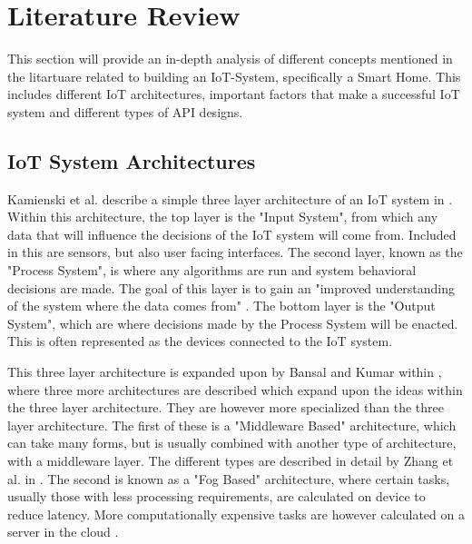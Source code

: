 \chapter{Literature Review} \label{cha:chapter2}
This section will provide an in-depth analysis of different concepts mentioned in the litartuare related to building an IoT-System, specifically a Smart Home. This includes different IoT architectures, important factors that make a successful IoT system and different types of API designs. 

\section{IoT System Architectures} \label{sec:chap2:architectures}
Kamienski et al. describe a simple three layer architecture of an IoT system in \cite{DesigningOpenIotSystem}. Within this architecture, the top layer is the "Input System", from which any data that will influence the decisions of the IoT system will come from. Included in this are sensors, but also user facing interfaces. The second layer, known as the "Process System", is where any algorithms are run and system behavioral decisions are made. The goal of this layer is to gain an "improved understanding of the system where the  data comes from" \cite{DesigningOpenIotSystem}. The bottom layer is the "Output System", which are where decisions made by the Process System will be enacted. This is often represented as the devices connected to the IoT system.

This three layer architecture is expanded upon by Bansal and Kumar within \cite{IotEcosystemSurvey}, where three more architectures are described which expand upon the ideas within the three layer architecture. They are however more specialized than the three layer architecture. The first of these is a "Middleware Based" architecture, which can take many forms, but is usually combined with another type of architecture, with a middleware layer. The different types are described in detail by Zhang et al. in \cite{MiddlewareIOTSurvey}. The second is known as a "Fog Based" architecture, where certain tasks, usually those with less processing requirements, are calculated on device to reduce latency. More computationally expensive tasks are however calculated on a server in the cloud \cite{IoTArchitectures}.

